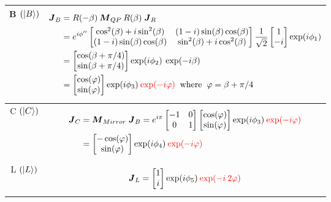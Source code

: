 \documentclass[11pt,a4paper]{article}
\numberwithin{equation}{section}
\begin{document}
\begin{table}[H]
\begin{tabular}{c c}
 	 B $(\ket{B})$& 
 	\parbox{5cm}{\begin{align*}
 			\boldsymbol{J}_B 
 			&=R(-\beta)\:\boldsymbol{M}_{QP}\:R(\beta) \;\boldsymbol{J}_R\\
 			&= e^{i\phi''}
 			\begin{bmatrix}
 				\cos[2](\beta)+i\sin[2](\beta)&(1-i)\sin(\beta)\cos(\beta) \\ 
 				(1-i)\sin(\beta)\cos(\beta) & \sin[2](\beta)+i\cos[2](\beta)
 			\end{bmatrix} 
 		\frac{1}{\sqrt{2}}\begin{bmatrix}1 \\ -i\end{bmatrix}\exp(i\phi_1)\\
 			&=\begin{bmatrix}\cos(\beta+\pi/4)\\\sin(\beta+\pi/4)\end{bmatrix} \exp(i\phi_2)\:\exp(-i\beta)\\
 			& = \begin{bmatrix}\cos(\varphi)\\\sin(\varphi)\end{bmatrix} \exp(i\phi_3)\:{\color{red}\exp(-i\varphi)}\:\text{ where }\:\varphi= \beta+\pi/4
 	\end{align*}}\\\hline
 	
 	C $(\ket{C})$&
 	\parbox{5cm}{\begin{align*}
 			\boldsymbol{J}_C 
 			&=\boldsymbol{M}_{Mirror} \;\boldsymbol{J}_B
 			= e^{i\pi}
 			\begin{bmatrix}
 				-1 & 0 \\ 0 & 1
 			\end{bmatrix} 
 			\begin{bmatrix}\cos(\varphi)\\\sin(\varphi)\end{bmatrix} \exp(i\phi_3)\:{\color{red}\exp(-i\varphi)}\\
 			&=\begin{bmatrix}-\cos(\varphi)\\\sin(\varphi)\end{bmatrix} \exp(i\phi_4)\:{\color{red}\exp(-i\varphi)}
 	\end{align*}}\\\hline
 	
 	L $(\ket{L})$&
 	\parbox{5cm}{\begin{align*}
 			\boldsymbol{J}_L 
 			=\begin{bmatrix}1\\i\end{bmatrix} \exp(i\phi_5)\:{\color{red}\exp(-i\:2\varphi)}
 	\end{align*}}\\\hline
 

\end{tabular}
\end{table}
\end{document}
